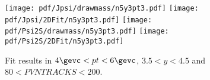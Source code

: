 \begin{figure}[H]
\begin{center}
\texttt{[image: pdf/Jpsi/drawmass/n5y3pt3.pdf]}
\texttt{[image: pdf/Jpsi/2DFit/n5y3pt3.pdf]}
\vspace*{-0.5cm}
\texttt{[image: pdf/Psi2S/drawmass/n5y3pt3.pdf]}
\texttt{[image: pdf/Psi2S/2DFit/n5y3pt3.pdf]}
\vspace*{-0.5cm}
\end{center}
\caption{Fit results in $4\gevc<pt<6\gevc$, $3.5<y<4.5$ and $80<PVNTRACKS<200$.}
\label{Fitn5y3pt3}
\end{figure}
